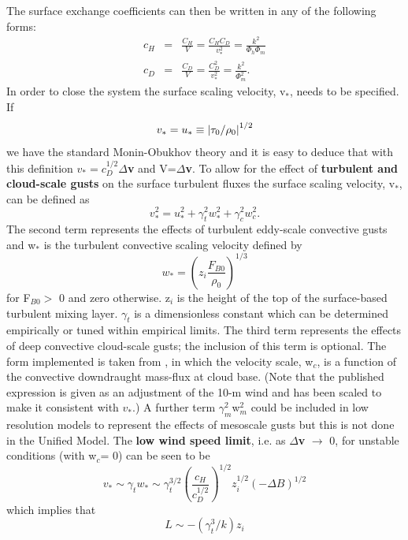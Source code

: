 \documentclass{UMDP_article}
\begin{document}
The surface exchange coefficients can then be written in any of the
following forms:
\begin{eqnarray}
  c_H&=&\frac{ C_H }{V} = \frac{ C_H  C_D }{ v_\ast ^2 } = \frac{ k^2 }{ \Phi _h  \Phi _m }\label{1.1.22}\\
  c_D&=&\frac{ C_D }{V} = \frac{ C_D^2 }{ v_\ast ^2 } = \frac{ k^2 }{ \Phi _m^2 }.
\label{1.1.23}
\end{eqnarray}
In order to close the system the surface scaling velocity, v$_{\ast
}$, needs to be specified. If
\begin{equation}
  v_\ast =  u_\ast \equiv \left| { {\rm {\bf \tau }}_{0} {/} \rho _{0} } \right|^{1/2}\label{1.1.24}
\end{equation}
we have the standard Monin-Obukhov theory and it is easy to deduce
that with this definition $v_{\ast } = c_{D}^{1/2} \Delta $\textbf{v}
and V=$\Delta $\textbf{v}.  To allow for the effect of
\textbf{turbulent and cloud-scale gusts }on the surface turbulent
fluxes the surface scaling velocity, v$_{\ast }$, can be defined as
\begin{equation}
  v_\ast ^2 =  u_\ast ^2 +  \gamma _t^2  w_\ast ^2 +  \gamma _c^2  w_c^2.
  \label{1.1.25}
\end{equation}
The second term represents the effects of turbulent eddy-scale
convective gusts and w$_{\ast }$ is the turbulent convective scaling
velocity defined by
\begin{equation}
  w_\ast =  {\left( { z_i \frac{ F_{B0} }{ \rho _0 }} \right)}^{1/3}
  \label{1.1.26}
\end{equation}
for F$_{B0} >$ 0 and zero otherwise. z$_{i}$ is the height of the top
of the surface-based turbulent mixing layer. $\gamma _{t}$ is a
dimensionless constant which can be determined empirically or tuned
within empirical limits.  The third term represents the effects of
deep convective cloud-scale gusts; the inclusion of this term is
optional. The form implemented is taken from
\cite{redelsperger00:_param_mesos_enhan_surfac_fluxes}, in which the
velocity scale, w$_{c}$, is a function of the convective downdraught
mass-flux at cloud base. (Note that the published expression is given
as an adjustment of the 10-m wind and has been scaled to make it
consistent with $v_\ast$.)  A further term $\gamma
_{m}^{2}$w$_{m}^{2}$ could be included in low resolution models to
represent the effects of mesoscale gusts but this is not done in the
Unified Model.  The\textbf{ low wind speed limit}, i.e. as $\Delta
$\textbf{v} $\to $ 0, for unstable conditions (with w$_{c }$= 0) can
be seen to be
\begin{equation}
  v_\ast \sim  \gamma _t  w_\ast \sim  \gamma _t^{3/2}  {\left( {\frac{ c_H }{ c_D^{1/2} }} \right)}^{1/2}  z_i^{1/2} (-\Delta B )^{1/2}
  \label{1.1.27}
\end{equation}
which implies that
\begin{equation}
  L \sim -( \gamma _t^3 /k)  z_i 
  \label{1.1.28}
\end{equation}
\end{document}
